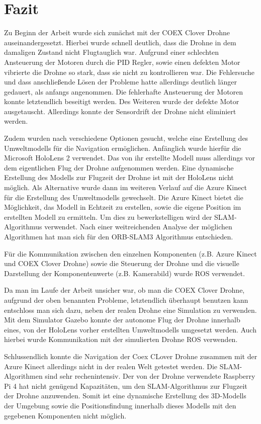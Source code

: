 \chapter{Fazit}
Zu Beginn der Arbeit wurde sich zunächst mit der COEX Clover Drohne auseinandergesetzt. Hierbei wurde schnell deutlich, dass die Drohne in dem damaligen Zustand nicht Flugtauglich war. Aufgrund einer schlechten Ansteuerung der Motoren durch die \ac{PID} Regler, sowie einen defekten Motor vibrierte die Drohne so stark, dass sie nicht zu kontrollieren war. Die Fehlersuche und dass anschließende Lösen der Probleme hatte allerdings deutlich länger gedauert, als anfangs angenommen. Die fehlerhafte Ansteuerung der Motoren konnte letztendlich beseitigt werden. Des Weiteren wurde der defekte Motor ausgetauscht. Allerdings konnte der Sensordrift der Drohne nicht eliminiert werden.

Zudem wurden nach verschiedene Optionen gesucht, welche eine Erstellung des Umweltmodells für die Navigation ermöglichen. Anfänglich wurde hierfür die Microsoft HoloLens 2 verwendet. Das von ihr erstellte Modell muss allerdings vor dem eigentlichen Flug der Drohne aufgenommen werden. Eine dynamische Erstellung des Modells zur Flugzeit der Drohne ist mit der HoloLens nicht möglich. Als Alternative wurde dann im weiteren Verlauf auf die Azure Kinect für die Erstellung des Umweltmodells gewechselt. Die Azure Kinect bietet die Möglichkeit, das Modell in Echtzeit zu erstellen, sowie die eigene Position im erstellten Modell zu ermitteln. Um dies zu bewerkstelligen wird der SLAM-Algorithmus verwendet. Nach einer weitreichenden Analyse der möglichen Algorithmen hat man sich für den ORB-SLAM3 Algorithmus entschieden.

Für die Kommunikation zwischen den einzelnen Komponenten (z.B. Azure Kinect und COEX Clover Drohne) sowie die Steuerung der Drohne und die visuelle Darstellung der Komponentenwerte (z.B. Kamerabild) wurde \ac{ROS} verwendet.

Da man im Laufe der Arbeit unsicher war, ob man die COEX Clover Drohne, aufgrund der oben benannten Probleme, letztendlich überhaupt benutzen kann entschloss man sich dazu, neben der realen Drohne eine Simulation zu verwenden. Mit dem Simulator Gazebo konnte der autonome Flug der Drohne innerhalb eines, von der HoloLens vorher erstellten Umweltmodells umgesetzt werden. Auch hierbei wurde Kommunikation mit der simulierten Drohne \ac{ROS} verwenden.


Schlussendlich konnte die Navigation der Coex CLover Drohne zusammen mit der Azure Kinect allerdings nicht in der realen Welt getestet werden. Die SLAM-Algorithmen sind sehr rechenintensiv. Der von der Drohne verwendete Raspberry Pi 4 hat nicht genügend Kapazitäten, um den SLAM-Algorithmus zur Flugzeit der Drohne anzuwenden. Somit ist eine dynamische Erstellung des 3D-Modells der Umgebung sowie die Positionsfindung innerhalb dieses Modells mit den gegebenen Komponenten nicht möglich.



